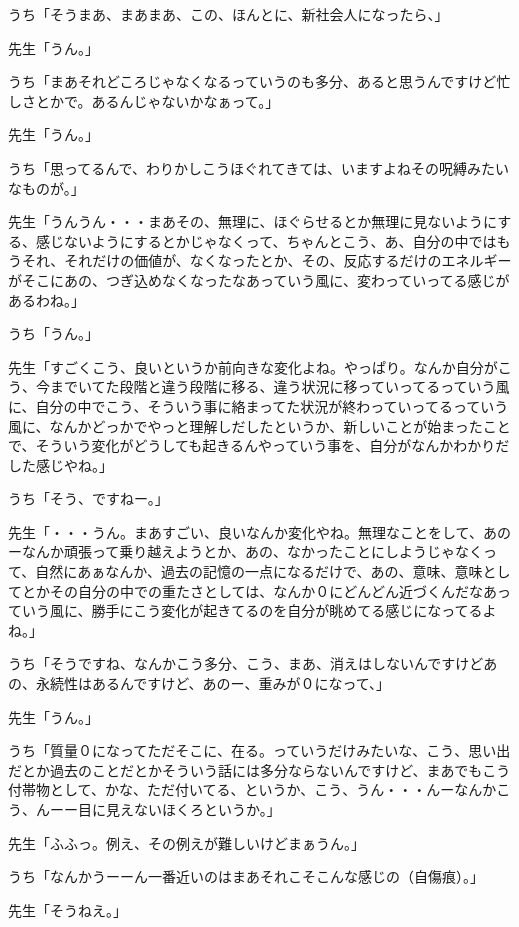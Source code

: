 \documentclass[b5j,twoside,twocolumn]{utarticle}
\begin{document}
\begin{description}
\item うち「そうまあ、まあまあ、この、ほんとに、新社会人になったら、」
\item 先生「うん。」
\item うち「まあそれどころじゃなくなるっていうのも多分、あると思うんですけど忙しさとかで。あるんじゃないかなぁって。」
\item 先生「うん。」
\item うち「思ってるんで、わりかしこうほぐれてきては、いますよねその呪縛みたいなものが。」
\item 先生「うんうん・・・まあその、無理に、ほぐらせるとか無理に見ないようにする、感じないようにするとかじゃなくって、ちゃんとこう、あ、自分の中ではもうそれ、それだけの価値が、なくなったとか、その、反応するだけのエネルギーがそこにあの、つぎ込めなくなったなあっていう風に、変わっていってる感じがあるわね。」
\item うち「うん。」
\item 先生「すごくこう、良いというか前向きな変化よね。やっぱり。なんか自分がこう、今までいてた段階と違う段階に移る、違う状況に移っていってるっていう風に、自分の中でこう、そういう事に絡まってた状況が終わっていってるっていう風に、なんかどっかでやっと理解しだしたというか、新しいことが始まったことで、そういう変化がどうしても起きるんやっていう事を、自分がなんかわかりだした感じやね。」
\item うち「そう、ですねー。」
\item 先生「・・・うん。まあすごい、良いなんか変化やね。無理なことをして、あのーなんか頑張って乗り越えようとか、あの、なかったことにしようじゃなくって、自然にあぁなんか、過去の記憶の一点になるだけで、あの、意味、意味としてとかその自分の中での重たさとしては、なんか０にどんどん近づくんだなあっていう風に、勝手にこう変化が起きてるのを自分が眺めてる感じになってるよね。」
\item うち「そうですね、なんかこう多分、こう、まあ、消えはしないんですけどあの、永続性はあるんですけど、あのー、重みが０になって、」
\item 先生「うん。」
\item うち「質量０になってただそこに、在る。っていうだけみたいな、こう、思い出だとか過去のことだとかそういう話には多分ならないんですけど、まあでもこう付帯物として、かな、ただ付いてる、というか、こう、うん・・・んーなんかこう、んーー目に見えないほくろというか。」
\item 先生「ふふっ。例え、その例えが難しいけどまぁうん。」
\item うち「なんかうーーん一番近いのはまあそれこそこんな感じの（自傷痕）。」
\item 先生「そうねえ。」

\end{description}
\end{document}
